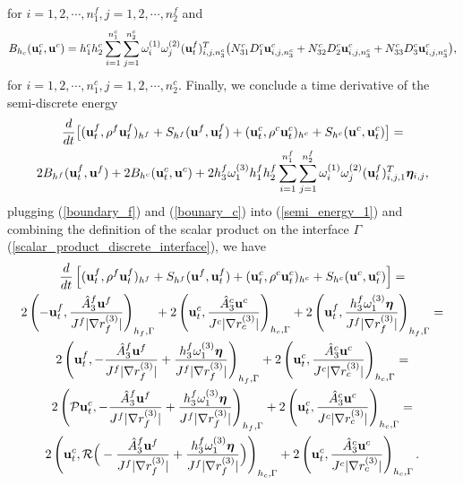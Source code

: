 \documentclass[a4paper]{article}
\begin{document}
for $i = 1,2,\cdots, n_1^f, j = 1,2,\cdots,n_2^f$ and 
\begin{equation}\label{bounary_c}
B_{h_c} ({\bf u}_t^c,{\bf u}^c) = h_1^ch_2^c\sum_{i = 1}^{ n_1^c}\sum_{j=1}^{n_2^c}\omega_i^{(1)}\omega_j^{(2)}({\bf u}_t^f)^T_{i,j,n_3^c}\big(N_{31}^cD_1^c {\bf u}^c_{i,j,n_3^c}+ N_{32}^cD_2^c{\bf u}^c_{i,j,n_3^c}+N_{33}^cD_3^c{\bf u}^c_{i,j,n_3^c}\big),
\end{equation}
for $i = 1,2,\cdots,n_1^c, j = 1,2,\cdots,n_2^c$. Finally, we conclude a time derivative of the semi-discrete energy
\begin{multline}\label{semi_energy_1}
\frac{d}{dt}\big[({\bf u}_t^f,\rho^f {\bf u}_t^f)_{h^f} + S_{h^f}({\bf u}^f,{\bf u}^f_t) + ({\bf u}_t^c,\rho^c {\bf u}_t^c)_{h^c} + S_{h^c}({\bf u}^c,{\bf u}^c_t) \big]  = \\
2B_{h^f}({\bf u}_t^f,{\bf u}^f) + 2B_{h^c}({\bf u}_t^c,{\bf u}^c) + 2h_3^f\omega_1^{(3)}h_1^f h_2^f\sum_{i=1}^{n_1^f}\sum_{j=1}^{n_2^f}\omega_i^{(1)}\omega_j^{(2)}({\bf u}_t^f)^T_{i,j,1}{\bm \eta}_{i,j},
\end{multline}
plugging (\ref{boundary_f}) and (\ref{bounary_c}) into (\ref{semi_energy_1}) and combining the definition of the scalar product on the interface $\Gamma$ (\ref{scalar_product_discrete_interface}), we have
\begin{multline}\label{semi_energy_2}
\frac{d}{dt}\left[({\bf u}_t^f,\rho^f {\bf u}_t^f)_{h^f} + S_{h^f}({\bf u}^f,{\bf u}^f_t) + ({\bf u}_t^c,\rho^c {\bf u}_t^c)_{h^c} + S_{h^c}({\bf u}^c,{\bf u}^c_t) \right]  = \\
2\left(-{\bf u}_t^f,\frac{\hat{A}_3^f{\bf u}^f}{J^f|\nabla r_f^{(3)}|}\right)_{h_f,\Gamma} + 2\left({\bf u}_t^c,\frac{\hat{A}_3^c{\bf u}^c}{J^c|\nabla r_c^{(3)}|}\right)_{h_c,\Gamma} + 2\left({\bf u}_t^f,\frac{h_3^f\omega_1^{(3)}{\bm \eta}}{J^f|\nabla r_f^{(3)}|}\right)_{h_f,\Gamma} = \\
2\left({\bf u}_t^f,-\frac{\hat{A}_3^f{\bf u}^f}{J^f|\nabla r_f^{(3)}|} + \frac{h_3^f\omega_1^{(3)}{\bm \eta}}{J^f|\nabla r_f^{(3)}|}\right)_{h_f,\Gamma} +  2\left({\bf u}_t^c,\frac{\hat{A}_3^c{\bf u}^c}{J^c|\nabla r_c^{(3)}|}\right)_{h_c,\Gamma} = \\
2\left(\mathcal{P}{\bf u}^c_t,-\frac{\hat{A}_3^f{\bf u}^f}{J^f|\nabla r_f^{(3)}|} + \frac{h_3^f\omega_1^{(3)}{\bm \eta}}{J^f|\nabla r_f^{(3)}|}\right)_{h_f,\Gamma} + 2\left({\bf u}_t^c,\frac{\hat{A}_3^c{\bf u}^c}{J^c|\nabla r_c^{(3)}|}\right)_{h_c,\Gamma} = \\
2\left({\bf u}_t^c,\mathcal{R}\Big(-\frac{\hat{A}_3^f{\bf u}^f}{J^f|\nabla r_f^{(3)}|} + \frac{h_3^f\omega_1^{(3)}{\bm \eta}}{J^f|\nabla r_f^{(3)}|}\Big)\right)_{h_c,\Gamma} + 2\left({\bf u}_t^c,\frac{\hat{A}_3^c{\bf u}^c}{J^c|\nabla r_c^{(3)}|}\right)_{h_c,\Gamma}.
\end{multline}
\end{document}
